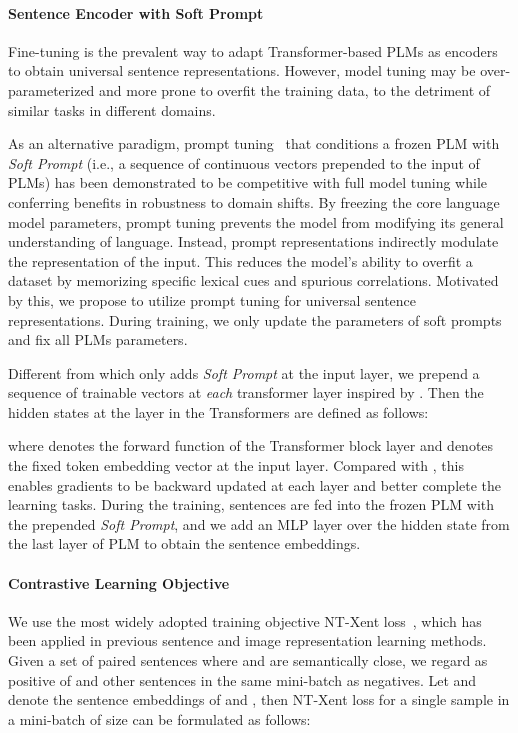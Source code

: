 \documentclass[11pt]{article}
\begin{document}
\paragraph{Sentence Encoder with Soft Prompt}
Fine-tuning is the prevalent way to adapt Transformer-based PLMs as encoders to obtain universal sentence representations. However, model tuning may be over-parameterized and more prone to overfit the training data, to the detriment of similar tasks in different domains.

As an alternative paradigm, prompt tuning~\cite{Lester21sacle, li2021prefix} that conditions a frozen PLM with \textit{Soft Prompt} (i.e., a sequence of continuous vectors prepended to the input of PLMs) has been demonstrated to be competitive with full model tuning while conferring benefits in robustness to domain shifts. By freezing the core language model parameters, prompt tuning prevents the model from modifying its general understanding of language. Instead, prompt representations indirectly modulate the representation of the input. This reduces the model’s ability to overfit a dataset by memorizing specific lexical cues and spurious correlations. Motivated by this, we propose to utilize prompt tuning for universal sentence representations.
During training, we only update the parameters of soft prompts and fix all PLMs parameters. 

Different from \cite{Lester21sacle} which only adds \textit{Soft Prompt} at the input layer, we prepend a sequence of trainable vectors  at \emph{each} transformer layer inspired by \cite{liu2021ptuningv2}. Then the  hidden states at the  layer  in the Transformers \cite{vaswani2017transformer} are defined as follows:

where  denotes the forward function of the Transformer block layer and  denotes the fixed token embedding vector at the input layer. Compared with \cite{Lester21sacle}, this enables gradients to be backward updated at each layer and better complete the learning tasks. 
During the training, sentences are fed into the frozen PLM with the prepended \textit{Soft Prompt}, and we add an MLP layer over the  hidden state from the last layer of PLM to obtain the sentence embeddings. 

\paragraph{Contrastive Learning Objective}We use the most widely adopted training objective NT-Xent loss~\cite{Chen2020simclr, gao2021simcse}, which has been applied in previous sentence and image representation learning methods. Given a set of paired sentences  where  and  are semantically close, we regard  as positive of  and other sentences in the same mini-batch as negatives. Let  and  denote the sentence embeddings of  and , then NT-Xent loss for a single sample in a mini-batch of size  can be formulated as follows:
\end{document}
